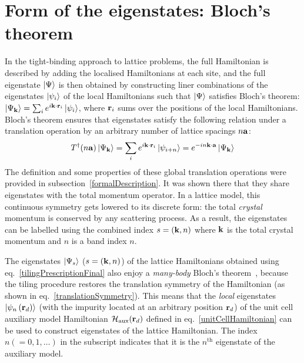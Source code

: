 \documentclass[reprint,hidelinks]{revtex4-2}
\begin{document}
\section{Form of the eigenstates: Bloch's theorem}
In the tight-binding approach to lattice problems, the full Hamiltonian is described by adding the localised Hamiltonians at each site, and the full eigenstate \(\ket{\Psi}\) is then obtained by constructing liner combinations of the eigenstates \(\ket{\psi_i}\) of the local Hamiltonians such that \(\ket{\Psi}\) satisfies Bloch's theorem: \(\ket{\Psi_{\bf k}} = \sum_{i} e^{i {\bf k}\cdot{\bf r}_i} \ket{\psi_i}\), where \({\bf r}_i\) sums over the positions of the local Hamiltonians. Bloch's theorem ensures that eigenstates satisfy the following relation under a translation operation by an arbitrary number of lattice spacings \({n\bf a}\):
\begin{equation}\begin{aligned}
	T^\dagger(n{\bf a})\ket{\Psi_{{\bf k}}} = \sum_{i} e^{i {\bf k}\cdot{\bf r}_i} \ket{\psi_{i + n}} = e^{-in{\bf k}\cdot{\bf a}}\ket{\Psi_{\bf k}}
\end{aligned}\end{equation}
The definition and some properties of these global translation operations were provided in subsection~\ref{formalDescription}. It was shown there that they share eigenstates with the total momentum operator. In a lattice model, this continuous symmetry gets lowered to its discrete form: the total {\it crystal} momentum is conserved by any scattering process. As a result, the eigenstates can be labelled using the combined index \(s = \left({\bf k}, n\right) \) where \({\bf k}\) is the total crystal momentum and \(n\) is a band index \(n\).

The eigenstates \(\ket{\Psi_{s}}\) (\(s = \left({\bf k}, n\right)\)) of the lattice Hamiltonians obtained using eq.~\ref{tilingPrescriptionFinal} also enjoy a {\it many-body} Bloch's theorem~\cite{stoyanova}, because the tiling procedure restores the translation symmetry of the Hamiltonian (as shown in eq.~\ref{translationSymmetry}). This means that the {\it local} eigenstates \(\ket{\psi_n\left({\bf r}_d\right)}\) (with the impurity located at an arbitrary position \({\bf r}_d\)) of the unit cell auxiliary model Hamiltonian \(\mathcal{H}_\text{aux}({\bf r}_d)\) defined in eq.~\ref{unitCellHamiltonian} can be used to construct eigenstates of the lattice Hamiltonian. The index \(n(=0,1,\ldots)\) in the subscript indicates that it is the \(n^\text{th}\) eigenstate of the auxiliary model.
\end{document}
